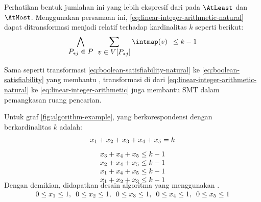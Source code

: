 Perhatikan bentuk jumlahan ini yang lebih ekspresif dari pada \(\AtLeast\) dan \(\AtMost\). Menggunakan persamaan ini, \autoref{eq:linear-integer-arithmetic-natural} dapat ditransformasi menjadi relatif terhadap kardinalitas \(k\) seperti berikut:
\begin{equation}
	\bigwedge \limits_{\displaystyle P_{*j} \in P} \enspace \sum \limits_{\displaystyle v \in V[P_{*j}]} \intmap(v) \enspace \leq k - 1
	\label{eq:linear-integer-arithmetic}
\end{equation}

Sama seperti transformasi \autoref{eq:boolean-satisfiability-natural} ke \autoref{eq:boolean-satisfiability} yang membantu , transformasi di  dari \autoref{eq:linear-integer-arithmetic-natural} ke \autoref{eq:linear-integer-arithmetic} juga membantu SMT dalam pemangkasan ruang pencarian.

\begin{example}
	Untuk graf \autoref{fig:algorithm-example},  yang berkorespondensi dengan  berkardinalitas \(k\) adalah:
	\[
		\smash[b]{
		\begin{array}{c}
			x_1 + x_2 + x_3 + x_4 + x_5 = k \\ [8pt]
			x_3 + x_4 + x_5 \leq k - 1 \\
			x_2 + x_4 + x_5 \leq k - 1 \\
			x_1 + x_4 + x_5 \leq k - 1 \\
			x_1 + x_2 + x_3 \leq k - 1 \\ [8pt]
			0 \leq x_1 \leq 1,\enspace
			0 \leq x_2 \leq 1,\enspace
			0 \leq x_3 \leq 1,\enspace
			0 \leq x_4 \leq 1,\enspace
			0 \leq x_5 \leq 1
		\end{array}
		} \vspace{1.5em}
	\]
	\label{ex:linear-integer-arithmetic-constraint}
\end{example}

Dengan demikian, didapatkan desain algoritma yang menggunakan .

